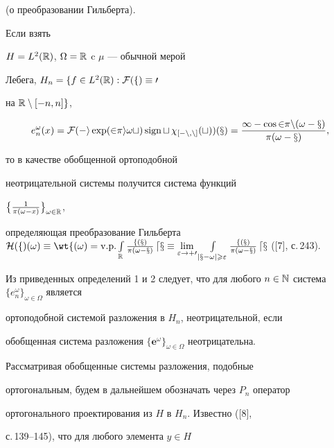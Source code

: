 \begin{note} (о преобразовании Гильберта).


Если взять


$H=L^2(\Bbb R)$, $\Omega=\Bbb R$ c $\mu$ --- обычной мерой


Лебега, $H_n=\{f\in L^2(\Bbb R):\cal F(f)\equiv 0$


на $\Bbb R\setminus[-n,n]\}$,


$$


e^\omega_n(x)=\cal F(-i\exp(2\pi i\omega t)


\sign t\,\chi_{[-n,n]}(t))(x)=\frac{1-\cos 2\pi


n(\omega-x)}{\pi(\omega-x)},


$$


то в качестве обобщенной ортоподобной


неотрицательной системы получится система функций


$\big\{\frac1{\pi(\omega-x)}\big\}_{\omega\in\Bbb R}$,


определяющая преобразование Гильберта $\cal H(f)(\omega)\equiv


\wt f(\omega)=\text{v.p.}\int\limits_{\Bbb R}\frac{f(x)}{\pi(\omega-x)}


\,dx\equiv\lim\limits_{\varepsilon\to+0}


\int\limits_{|x-\omega|\geqslant\varepsilon}\frac{f(x)}


{\pi(\omega-x)}\,dx$ ([7], с.\,243).


\end{note}





Из приведенных определений 1 и 2 следует, что для любого $n\in


\Bbb N$ система $\{e^\omega_n\}_{\omega\in\Omega}$ является


ортоподобной системой разложения в $H_n$, неотрицательной, если


обобщенная система разложения $\{\boldsymbol e^\omega\}_{\omega\in


\Omega}$ неотрицательна.





Рассматривая обобщенные системы разложения, подобные


ортогональным, будем в дальнейшем обозначать через $P_n$ оператор


ортогонального проектирования из $H$ в $H_n$. Известно ([8],


с.\,139--145), что для любого элемента $y\in H$


